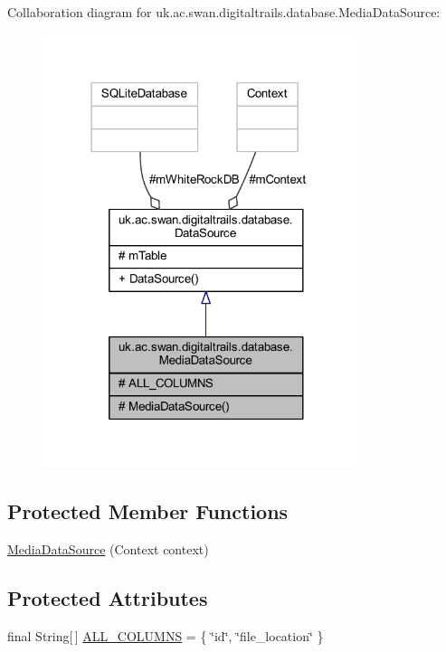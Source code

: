 Collaboration diagram for uk.\+ac.\+swan.\+digitaltrails.\+database.\+Media\+Data\+Source\+:
\nopagebreak
\begin{figure}[H]
\begin{center}
\leavevmode
\includegraphics[width=259pt]{classuk_1_1ac_1_1swan_1_1digitaltrails_1_1database_1_1_media_data_source__coll__graph}
\end{center}
\end{figure}
\subsection*{Protected Member Functions}
\begin{DoxyCompactItemize}
\item 
\hyperlink{classuk_1_1ac_1_1swan_1_1digitaltrails_1_1database_1_1_media_data_source_a51583f6bffcc8cf672aa2d2b50f52654}{Media\+Data\+Source} (Context context)
\end{DoxyCompactItemize}
\subsection*{Protected Attributes}
\begin{DoxyCompactItemize}
\item 
final String\mbox{[}$\,$\mbox{]} \hyperlink{classuk_1_1ac_1_1swan_1_1digitaltrails_1_1database_1_1_media_data_source_a1da52fc2b3e0eafb762c0f18a04c82e8}{A\+L\+L\+\_\+\+C\+O\+L\+U\+M\+N\+S} = \{ \char`\"{}id\char`\"{}, \char`\"{}file\+\_\+location\char`\"{} \}
\end{DoxyCompactItemize}
